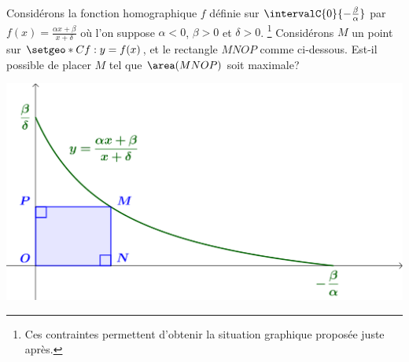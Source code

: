 Considérons la fonction homographique $f$ définie sur $\intervalC{0}{- \frac{\beta}{\alpha}}$ par $f(x) = \frac{\alpha x + \beta}{x + \delta}$ où l'on suppose
$\alpha < 0$,
$\beta > 0$
et
$\delta > 0$.%
\footnote{
	Ces contraintes permettent d'obtenir la situation graphique proposée juste après.
}
%
Considérons $M$ un point sur $\setgeo*{C}{f}: y = f(x)$, et le rectangle $MNOP$ comme ci-dessous. Est-il possible de placer $M$ tel que $\area(MNOP)$ soit maximale?

\smallskip

\begin{center}
	\includegraphics[scale=.67]{goal.png}
\end{center}